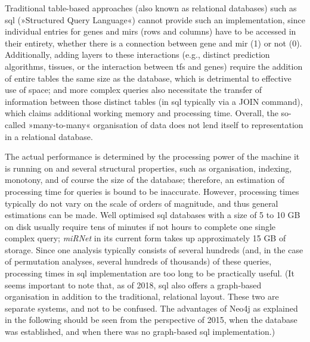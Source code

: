 Traditional table-based approaches (also known as relational databases) such as \acs{sql}  (»Structured Query Language«) cannot provide such an implementation, since individual entries for genes and \acp{mir} (rows and columns) have to be accessed in their entirety, whether there is a connection between gene and \ac{mir} (1) or not (0). Additionally, adding layers to these interactions (e.g., distinct prediction algorithms, tissues, or the interaction between \acp{tf} and genes) require the addition of entire tables the same size as the database, which is detrimental to effective use of space; and more complex queries also necessitate the transfer of information between those distinct tables (in \ac{sql} typically via a \textcolor{dkblue}{JOIN} command), which claims additional working memory and processing time. Overall, the so-called »many-to-many« organisation of data does not lend itself to representation in a relational database. 


The actual performance is determined by the processing power of the machine it is running on and several structural properties, such as organisation, indexing, monotony, and of course the size of the database; therefore, an estimation of processing time for queries is bound to be inaccurate. However, processing times typically do not vary on the scale of orders of magnitude, and thus general estimations can be made. Well optimised \ac{sql} databases with a size of 5 to 10 GB on disk usually require tens of minutes if not hours to complete one single complex query\cite{Chaudhuri2004}; \textit{miRNet} in its current form takes up approximately 15 GB of storage. Since one analysis typically consists of several hundreds (and, in the case of permutation analyses, several hundreds of thousands) of these queries, processing times in \ac{sql} implementation are too long to be practically useful. (It seems important to note that, as of 2018, \ac{sql} also offers a graph-based organisation in addition to the traditional, relational layout. These two are separate systems, and not to be confused. The advantages of Neo4j as explained in the following should be seen from the perspective of 2015, when the database was established, and when there was no graph-based \ac{sql} implementation.)

